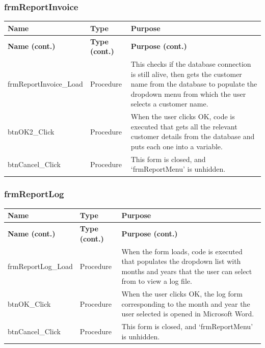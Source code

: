 	\subsubsection{frmReportInvoice}
	\begin{longtable}{ | p{5cm} | p{3cm} | p{9cm} | }
		\hline
		\textbf{Name} & \textbf{Type} & \textbf{Purpose}\\
		\endfirsthead
		\hline
		\textbf{Name (cont.)} & \textbf{Type (cont.)} & \textbf{Purpose (cont.)}\\
		\endhead
		\hline
		frmReportInvoice\_Load & Procedure & This checks if the database connection is still alive, then gets the customer name from the database to populate the dropdown menu from which the user selects a customer name.\\
		\hline
		btnOK2\_Click & Procedure & When the user clicks OK, code is executed that gets all the relevant customer details from the database and puts each one into a variable.\\
		\hline
		btnCancel\_Click & Procedure & This form is closed, and `frmReportMenu' is unhidden.\\
		\hline
	\end{longtable}
	
	\subsubsection{frmReportLog}
	\begin{longtable}{ | p{5cm} | p{3cm} | p{9cm} | }
		\hline
		\textbf{Name} & \textbf{Type} & \textbf{Purpose}\\
		\endfirsthead
		\hline
		\textbf{Name (cont.)} & \textbf{Type (cont.)} & \textbf{Purpose (cont.)}\\
		\endhead
		\hline
		frmReportLog\_Load & Procedure & When the form loads, code is executed that populates the dropdown list with months and years that the user can select from to view a log file.\\
		\hline
		btnOK\_Click & Procedure & When the user clicks OK, the log form corresponding to the month and year the user selected is opened in Microsoft Word.\\
		\hline
		btnCancel\_Click & Procedure & This form is closed, and `frmReportMenu' is unhidden.\\
		\hline
	\end{longtable}

